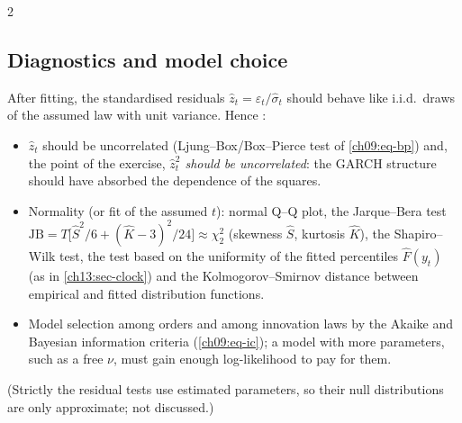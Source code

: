 \begin{paracol}{2}
\subsection{Diagnostics and model choice}\label{ch13:sec-diag}
After fitting, the standardised residuals $\hat z_t=\hat\varepsilon_t/\hat\sigma_t$ should behave like i.i.d.\ draws of the assumed law with unit variance. Hence :
\begin{itemize}
  \item $\hat z_t$ should be uncorrelated (Ljung--Box/Box--Pierce test of \cref{ch09:eq-bp}) and, the point of the exercise, \emph{$\hat z_t^2$ should be uncorrelated}: the GARCH structure should have absorbed the dependence of the squares.
  \item Normality (or fit of the assumed $t$): normal Q--Q plot, the Jarque--Bera test $\mathrm{JB}=T\bigl[\hat S^2/6+(\hat K-3)^2/24\bigr]\approx\chi^2_2$ (skewness $\hat S$, kurtosis $\hat K$), the Shapiro--Wilk test, the test based on the uniformity of the fitted percentiles $\hat F(y_t)$
        (as in \cref{ch13:sec-clock}) and the Kolmogorov--Smirnov distance between empirical and fitted distribution functions.
  \item Model selection among orders and among innovation laws by the Akaike and Bayesian information criteria (\cref{ch09:eq-ic}); a model with more parameters, such as a free $\nu$, must gain enough log-likelihood to pay for them.
\end{itemize}
(Strictly the residual tests use estimated parameters, so their null distributions are only approximate; not discussed.)


\end{paracol}
